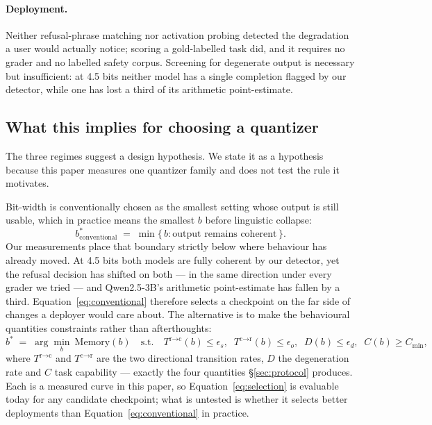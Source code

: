 \documentclass[11pt,a4paper]{article}
\begin{document}
\paragraph{Deployment.} Neither refusal-phrase matching nor activation probing
detected the degradation a user would actually notice; scoring a gold-labelled
task did, and it requires no grader and no labelled safety corpus. Screening for
degenerate output is necessary but insufficient: at 4.5 bits neither model has a
single completion flagged by our detector, while one has lost a third of its
arithmetic point-estimate.

\subsection{What this implies for choosing a quantizer}
\label{sec:prediction}

The three regimes suggest a design hypothesis. We state it as a hypothesis
because this paper measures one quantizer family and does not test the rule it
motivates.

Bit-width is conventionally chosen as the smallest setting whose output is still
usable, which in practice means the smallest $b$ before linguistic collapse:
\begin{equation}
  b^{*}_{\text{conventional}} \;=\; \min\{\,b : \text{output remains coherent}\,\}.
  \label{eq:conventional}
\end{equation}
Our measurements place that boundary strictly below where behaviour has already
moved. At 4.5 bits both models are fully coherent by our detector, yet the
refusal decision has shifted on both --- in the same direction under every
grader we tried --- and Qwen2.5-3B's arithmetic point-estimate has fallen by a
third. Equation~\ref{eq:conventional} therefore
selects a checkpoint on the far side of changes a deployer would care about. The
alternative is to make the behavioural quantities constraints rather than
afterthoughts:
\begin{equation}
  b^{*} \;=\; \arg\min_{b}\ \mathrm{Memory}(b)
  \quad\text{s.t.}\quad
  T^{\text{r}\to\text{c}}(b) \le \epsilon_{s},\;\;
  T^{\text{c}\to\text{r}}(b) \le \epsilon_{o},\;\;
  D(b) \le \epsilon_{d},\;\;
  C(b) \ge C_{\min},
  \label{eq:selection}
\end{equation}
where $T^{\text{r}\to\text{c}}$ and $T^{\text{c}\to\text{r}}$ are the two
directional transition rates, $D$ the degeneration rate and $C$ task capability
--- exactly the four quantities \S\ref{sec:protocol} produces. Each is a measured
curve in this paper, so Equation~\ref{eq:selection} is evaluable today for any
candidate checkpoint; what is untested is whether it selects better deployments
than Equation~\ref{eq:conventional} in practice.
\end{document}
